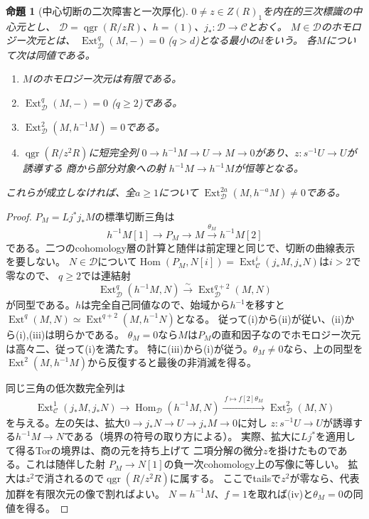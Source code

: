 \documentclass[11pt,a4paper]{ltjsarticle}
\newtheorem{proposition}[theorem]{命題}
\theoremstyle{definition}
\newcommand{\qgr}{\operatorname{qgr}}
\begin{document}
\begin{proposition}[中心切断の二次障害と一次厚化]
\label{prop:ou-central-first-thickening}
$0\ne z\in Z(R)_1$を内在的三次標識の中心元とし、
$\mathcal D=\qgr(R/zR)$、$h=(1)$、$j_*:\mathcal D\to\mathcal C$とおく。
$M\in\mathcal D$のホモロジー次元とは、
$\operatorname{Ext}^q_{\mathcal D}(M,-)=0$ ($q>d$)となる最小の$d$をいう。
各$M$について次は同値である。
\begin{enumerate}[label=(\roman*)]
\item $M$のホモロジー次元は有限である。
\item $\operatorname{Ext}^q_{\mathcal D}(M,-)=0$ ($q\ge2$)である。
\item $\operatorname{Ext}^2_{\mathcal D}(M,h^{-1}M)=0$である。
\item $\qgr(R/z^2R)$に短完全列
$0\to h^{-1}M\to U\to M\to0$があり、$z:s^{-1}U\to U$が誘導する
商から部分対象への射 $h^{-1}M\to h^{-1}M$が恒等となる。
\end{enumerate}
これらが成立しなければ、全$a\ge1$について
$\operatorname{Ext}^{2a}_{\mathcal D}(M,h^{-a}M)\ne0$である。
\end{proposition}
\begin{proof}
$P_M=Lj^*j_*M$の標準切断三角は
\[
 h^{-1}M[1]\longrightarrow P_M\longrightarrow M
 \xrightarrow{\theta_M}h^{-1}M[2]
\]
である。二つのcohomology層の計算と随伴は前定理と同じで、切断の曲線表示を要しない。
$N\in\mathcal D$について$\operatorname{Hom}(P_M,N[i])
=\operatorname{Ext}^i_{\mathcal C}(j_*M,j_*N)$は$i>2$で零なので、
$q\ge2$では連結射
\[
 \operatorname{Ext}^q_{\mathcal D}(h^{-1}M,N)
   \xrightarrow{\ \sim\ }\operatorname{Ext}^{q+2}_{\mathcal D}(M,N)
\]
が同型である。$h$は完全自己同値なので、始域から$h^{-1}$を移すと
$\operatorname{Ext}^q(M,N)\simeq\operatorname{Ext}^{q+2}(M,h^{-1}N)$となる。
従って(i)から(ii)が従い、(ii)から(i),(iii)は明らかである。
$\theta_M=0$なら$M$は$P_M$の直和因子なのでホモロジー次元は高々二、従って(i)を満たす。
特に(iii)から(i)が従う。$\theta_M\ne0$なら、上の同型を
$\operatorname{Ext}^2(M,h^{-1}M)$から反復すると最後の非消滅を得る。

同じ三角の低次数完全列は
\[
 \operatorname{Ext}^1_{\mathcal C}(j_*M,j_*N)\longrightarrow
 \operatorname{Hom}_{\mathcal D}(h^{-1}M,N)
 \xrightarrow{\ f\mapsto f[2]\theta_M\ }
 \operatorname{Ext}^2_{\mathcal D}(M,N)
\]
を与える。左の矢は、拡大$0\to j_*N\to U\to j_*M\to0$に対し
$z:s^{-1}U\to U$が誘導する$h^{-1}M\to N$である（境界の符号の取り方による）。
実際、拡大に$Lj^*$を適用して得るTorの境界は、商の元を持ち上げて
二項分解の微分$z$を掛けたものである。これは随伴した射
$P_M\to N[1]$の負一次cohomology上の写像に等しい。
拡大は$z^2$で消されるので$\qgr(R/z^2R)$に属する。
ここでtailsで$z^2$が零なら、代表加群を有限次元の像で割ればよい。
$N=h^{-1}M$、$f=1$を取れば(iv)と$\theta_M=0$の同値を得る。
\end{proof}
\end{document}
